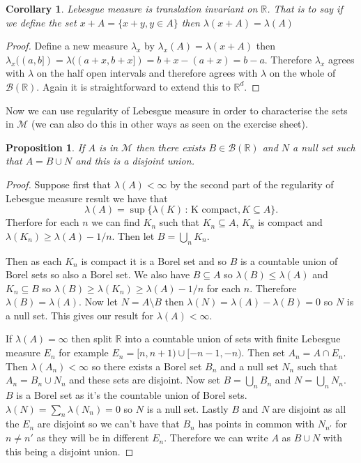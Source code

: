 \documentclass[
]{book}
\newtheorem{corollary}{Corollary}[chapter]
\newtheorem{proposition}{Proposition}[chapter]
\theoremstyle{definition}
\theoremstyle{definition}
\theoremstyle{definition}
\theoremstyle{definition}
\theoremstyle{remark}
\begin{document}
\begin{corollary}
Lebesgue measure is translation invariant on \(\mathbb{R}\). That is to say if we define the set \(x+A = \{ x+y, y \in A\}\) then \(\lambda(x+A) = \lambda(A)\)
\end{corollary}

\begin{proof}
Define a new measure \(\lambda_x\) by \(\lambda_x(A) = \lambda(x+A)\) then \(\lambda_x((a,b]) = \lambda((a+x,b+x]) = b+x -(a+x) = b-a\). Therefore \(\lambda_x\) agrees with \(\lambda\) on the half open intervals and therefore agrees with \(\lambda\) on the whole of \(\mathcal{B}(\mathbb{R})\). Again it is straightforward to extend this to \(\mathbb{R}^d\).
\end{proof}

Now we can use regularity of Lebesgue measure in order to characterise the sets in \(\mathscr{M}\) (we can also do this in other ways as seen on the exercise sheet).

\begin{proposition}
If \(A\) is in \(\mathscr{M}\) then there exists \(B \in \mathcal{B}(\mathbb{R})\) and \(N\) a null set such that \(A= B \cup N\) and this is a disjoint union.
\end{proposition}

\begin{proof}
Suppose first that \(\lambda(A)< \infty\) by the second part of the regularity of Lebesgue measure result we have that
\[\lambda(A) = \sup\{ \lambda(K) \,:\, \mbox{K compact}, K \subseteq A\}. \]
Therfore for each \(n\) we can find \(K_n\) such that \(K_n \subseteq A\), \(K_n\) is compact and \(\lambda(K_n) \geq \lambda(A)-1/n\). Then let \(B = \bigcup_n K_n\).

Then as each \(K_n\) is compact it is a Borel set and so \(B\) is a countable union of Borel sets so also a Borel set. We also have \(B \subseteq A\) so \(\lambda(B) \leq \lambda(A)\) and \(K_n \subseteq B\) so \(\lambda(B)\geq \lambda(K_n) \geq \lambda(A)-1/n\) for each \(n\). Therefore \(\lambda(B) = \lambda(A)\). Now let \(N= A \setminus B\) then \(\lambda(N) = \lambda(A) - \lambda(B)=0\) so \(N\) is a null set. This gives our result for \(\lambda(A) < \infty\).

If \(\lambda(A) = \infty\) then split \(\mathbb{R}\) into a countable union of sets with finite Lebesgue measure \(E_n\) for example \(E_n = [n, n+1)\cup [-n-1,-n)\). Then set \(A_n = A \cap E_n\). Then \(\lambda(A_n) < \infty\) so there exists a Borel set \(B_n\) and a null set \(N_n\) such that \(A_n = B_n \cup N_n\) and these sets are disjoint. Now set \(B = \bigcup_n B_n\) and \(N = \bigcup_n N_n\). \(B\) is a Borel set as it's the countable union of Borel sets. \(\lambda(N) = \sum_n \lambda(N_n) = 0\) so \(N\) is a null set. Lastly \(B\) and \(N\) are disjoint as all the \(E_n\) are disjoint so we can't have that \(B_n\) has points in common with \(N_{n'}\) for \(n \neq n'\) as they will be in different \(E_n\). Therefore we can write \(A\) as \(B \cup N\) with this being a disjoint union.
\end{proof}
\end{document}
